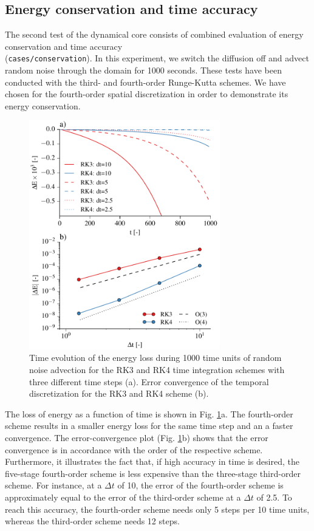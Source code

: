 \documentclass[gmd,manuscript]{copernicus}
\begin{document}
\subsection{Energy conservation and time accuracy} \label{sec:validationtime}
The second test of the dynamical core consists of combined evaluation of energy conservation and time accuracy\\
(\texttt{cases/conservation}). In this experiment, we switch the diffusion off and advect random noise through the domain for 1000 seconds. These tests have been conducted with the third- and fourth-order Runge-Kutta schemes. We have chosen for the fourth-order spatial discretization in order to demonstrate its energy conservation.
\begin{figure}[t]
\vspace*{2mm}
\begin{center}
\includegraphics[width=8.3cm]{figs/timeconvergence.pdf}
\end{center}
\caption{Time evolution of the energy loss during 1000 time units of random noise advection for the RK3 and RK4 time integration schemes with three different time steps (a). Error convergence of the temporal discretization for the RK3 and RK4 scheme (b).}\label{fig:timeconvergence}
\end{figure}

The loss of energy as a function of time is shown in Fig. \ref{fig:timeconvergence}a. The fourth-order scheme results in a smaller energy loss for the same time step and an a faster convergence. The error-convergence plot (Fig. \ref{fig:timeconvergence}b) shows that the error convergence is in accordance with the order of the respective scheme. Furthermore, it illustrates the fact that, if high accuracy in time is desired, the five-stage fourth-order scheme is less expensive than the three-stage third-order scheme. For instance, at a $\Delta t$ of 10, the error of the fourth-order scheme is approximately equal to the error of the third-order scheme at a $\Delta t$ of 2.5. To reach this accuracy, the fourth-order scheme needs only 5 steps per 10 time units, whereas the third-order scheme needs 12 steps.
\end{document}
